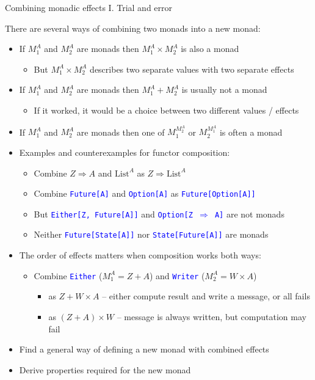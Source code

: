 \documentclass[english]{beamer}
\begin{document}
\begin{frame}{Combining monadic effects I. Trial and error}

There are several ways of combining two monads into a new monad:
\begin{itemize}
\item If $M_{1}^{A}$ and $M_{2}^{A}$ are monads then $M_{1}^{A}\times M_{2}^{A}$
is also a monad
\begin{itemize}
\item But $M_{1}^{A}\times M_{2}^{A}$ describes two separate values with
two separate effects
\end{itemize}
\item If $M_{1}^{A}$ and $M_{2}^{A}$ are monads then $M_{1}^{A}+M_{2}^{A}$
is usually not a monad
\begin{itemize}
\item If it worked, it would be a choice between two different values /
effects
\end{itemize}
\item If $M_{1}^{A}$ and $M_{2}^{A}$ are monads then one of $M_{1}^{M_{2}^{A}}$
or $M_{2}^{M_{1}^{A}}$ is often a monad
\item Examples and counterexamples for functor composition:
\begin{itemize}
\item Combine $Z\Rightarrow A$ and $\text{List}^{A}$ as $Z\Rightarrow\text{List}^{A}$
\item Combine \texttt{\textcolor{blue}{\footnotesize{}Future{[}A{]}}} and
\texttt{\textcolor{blue}{\footnotesize{}Option{[}A{]}}} as \texttt{\textcolor{blue}{\footnotesize{}Future{[}Option{[}A{]}{]}}} 
\item But \texttt{\textcolor{blue}{\footnotesize{}Either{[}Z, Future{[}A{]}{]}}}
and \texttt{\textcolor{blue}{\footnotesize{}Option{[}Z $\Rightarrow$
A{]}}} are not monads
\item Neither \texttt{\textcolor{blue}{\footnotesize{}Future{[}State{[}A{]}{]}}}
nor \texttt{\textcolor{blue}{\footnotesize{}State{[}Future{[}A{]}{]}}}
are monads
\end{itemize}
\item The order of effects matters when composition works both ways: 
\begin{itemize}
\item Combine \texttt{\textcolor{blue}{\footnotesize{}Either}} ($M_{1}^{A}=Z+A$)
and \texttt{\textcolor{blue}{\footnotesize{}Writer}} ($M_{2}^{A}=W\times A$) 
\begin{itemize}
\item as $Z+W\times A$ -- either compute result and write a message, or
all fails
\item as $\left(Z+A\right)\times W$ -- message is always written, but
computation may fail
\end{itemize}
\end{itemize}
\item Find a general way of defining a new monad with combined effects
\item Derive properties required for the new monad
\end{itemize}
\end{frame}
\end{document}
